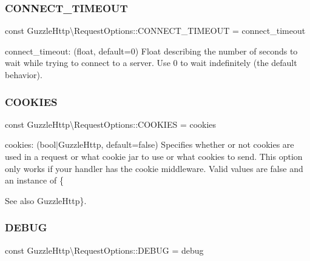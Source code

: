 \subsubsection{\texorpdfstring{C\+O\+N\+N\+E\+C\+T\+\_\+\+T\+I\+M\+E\+O\+UT}{CONNECT\_TIMEOUT}}
{\footnotesize\ttfamily const Guzzle\+Http\textbackslash{}\+Request\+Options\+::\+C\+O\+N\+N\+E\+C\+T\+\_\+\+T\+I\+M\+E\+O\+UT = \textquotesingle{}connect\+\_\+timeout\textquotesingle{}}

connect\+\_\+timeout\+: (float, default=0) Float describing the number of seconds to wait while trying to connect to a server. Use 0 to wait indefinitely (the default behavior). \mbox{\label{classGuzzleHttp_1_1RequestOptions_a000c2e4aacadb24f50bdbe8b9de7d66b}} 
\subsubsection{\texorpdfstring{C\+O\+O\+K\+I\+ES}{COOKIES}}
{\footnotesize\ttfamily const Guzzle\+Http\textbackslash{}\+Request\+Options\+::\+C\+O\+O\+K\+I\+ES = \textquotesingle{}cookies\textquotesingle{}}

cookies\+: (bool$\vert$\+Guzzle\+Http, default=false) Specifies whether or not cookies are used in a request or what cookie jar to use or what cookies to send. This option only works if your handler has the {\ttfamily cookie} middleware. Valid values are {\ttfamily false} and an instance of \{\begin{DoxySeeAlso}{See also}
Guzzle\+Http\}. 
\end{DoxySeeAlso}
\mbox{\label{classGuzzleHttp_1_1RequestOptions_a0daced002d8b905dceeba32b01e30254}} 
\subsubsection{\texorpdfstring{D\+E\+B\+UG}{DEBUG}}
{\footnotesize\ttfamily const Guzzle\+Http\textbackslash{}\+Request\+Options\+::\+D\+E\+B\+UG = \textquotesingle{}debug\textquotesingle{}}

